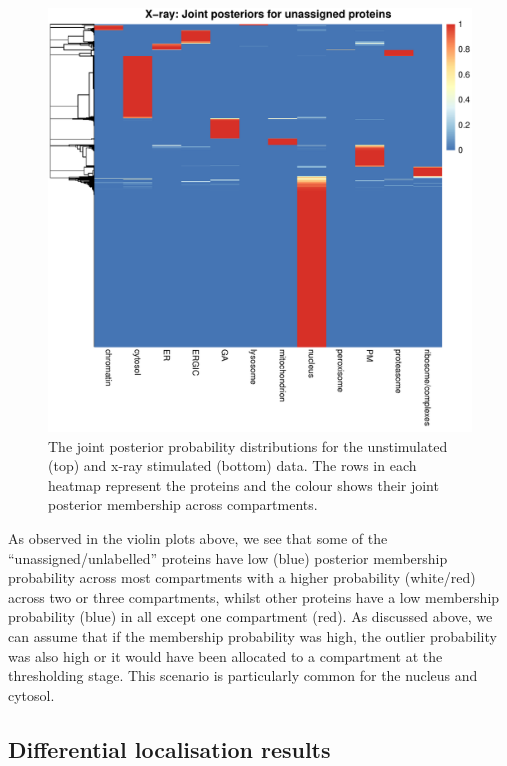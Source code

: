 \documentclass[9pt,a4paper,]{extarticle}
\begin{document}
\begin{figure}[H]

{\centering \includegraphics[width=0.8\linewidth,]{figs/cond2_unass_post} 

}

\caption{The joint posterior probability distributions for the unstimulated (top) and x-ray stimulated (bottom) data. The rows in each heatmap represent the proteins and the colour shows their joint posterior membership across compartments.}\label{fig:bandle-heatmap}
\end{figure}

As observed in the violin plots above, we see that some of the ``unassigned/unlabelled''
proteins have low (blue) posterior membership probability across most compartments
with a higher probability (white/red) across two or three compartments, whilst
other proteins have a low membership probability (blue) in all except one compartment
(red). As discussed above, we can assume that if the membership probability was high,
the outlier probability was also high or it would have been allocated to a compartment at
the thresholding stage. This scenario is particularly common for the nucleus
and cytosol.

\subsection{Differential localisation results}\label{differential-localisation-results}
\end{document}
